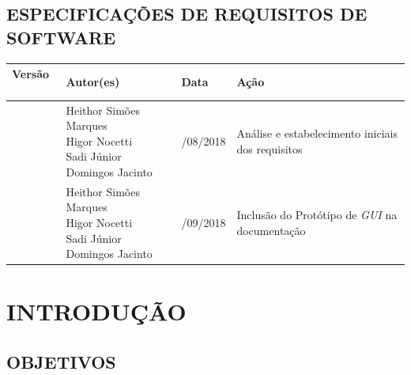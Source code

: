 \documentclass[12pt,a4paper,brazil,abntex2]{article}
\begin{document}
\newpage

\begin{center}

\section*{\normalsize ESPECIFICAÇÕES DE REQUISITOS DE SOFTWARE}
\thispagestyle{empty}
\end{center}

		\begin{table}[h]
			\begin{center}
			\begin{tabular}{|p{2cm}|p{4.5cm}|p{2cm}|p{4cm}|}
			\hline
				{\bf Versão} \	& {\bf Autor(es)}				& {\bf Data} 	& {\bf Ação}	\\\hline
				\parbox[c][\linewidth][c]{\linewidth}{} &
				\parbox[c][\linewidth][c]{\linewidth}{\centering Heithor Simões Marques\newline
								    							    Higor Nocetti\newline
								  							    Sadi Júnior Domingos Jacinto}&
				\parbox[c][\linewidth][c]{\linewidth}{/08/2018} &
				\parbox[c][\linewidth][c]{\linewidth}{\centering Análise e estabelecimento iniciais dos requisitos}\\\hline 
				
				\parbox[c][\linewidth][c]{\linewidth}{} &
				\parbox[c][\linewidth][c]{\linewidth}{\centering Heithor Simões Marques\newline
								    							    Higor Nocetti\newline
								  							    Sadi Júnior Domingos Jacinto}&
				\parbox[c][\linewidth][c]{\linewidth}{/09/2018} &
				\parbox[c][\linewidth][c]{\linewidth}{\centering Inclusão do Protótipo de \textit{GUI} na documentação}\\\hline 
			\end{tabular}
			\end{center}
		\end{table}
\newpage

\thispagestyle{empty}
\tableofcontents
\newpage
\section{\normalsize INTRODUÇÃO}
	\subsection{\normalsize OBJETIVOS}
	
\end{document}
